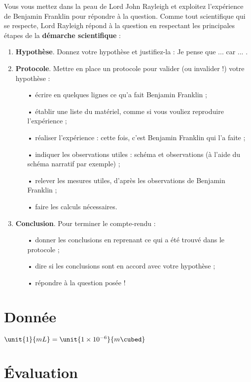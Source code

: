 \documentclass[12pt,a4paper]{article}
\begin{document}
Vous vous mettez dans la peau de Lord John Rayleigh et exploitez l'expérience de Benjamin Franklin pour répondre à la question.
Comme tout scientifique qui se respecte, Lord Rayleigh répond à la question en respectant les principales étapes de la \textbf{démarche scientifique} :
\begin{enumerate}
\item \textbf{Hypothèse}.
Donnez votre hypothèse et justifiez-la : \og Je pense que ... car ... \fg{}.
\item \textbf{Protocole}.
Mettre en place un protocole pour valider (ou invalider !) votre hypothèse :
\begin{itemize}
\item[•] écrire en quelques lignes ce qu'a fait Benjamin Franklin ;
\item[•] établir une liste du matériel, comme si vous vouliez reproduire l'expérience ;
\item[•] réaliser l'expérience : cette fois, c'est Benjamin Franklin qui l'a faite ;
\item[•] indiquer les observations utiles : schéma et observations (à l'aide du schéma narratif par exemple) ;
\item[•] relever les mesures utiles, d'après les observations de Benjamin Franklin ;
\item[•] faire les calculs nécessaires.
\end{itemize}
\item \textbf{Conclusion}. Pour terminer le compte-rendu :
\begin{itemize}
\item[•] donner les conclusions en reprenant ce qui a été trouvé dans le protocole ;
\item[•] dire si les conclusions sont en accord avec votre hypothèse ;
\item[•] répondre à la question posée !
\end{itemize}
\end{enumerate}

\section*{Donnée}

$ \unit{1}{mL} = \unit{1\times 10^{-6}}{m\cubed}$

\section*{Évaluation}
\end{document}
